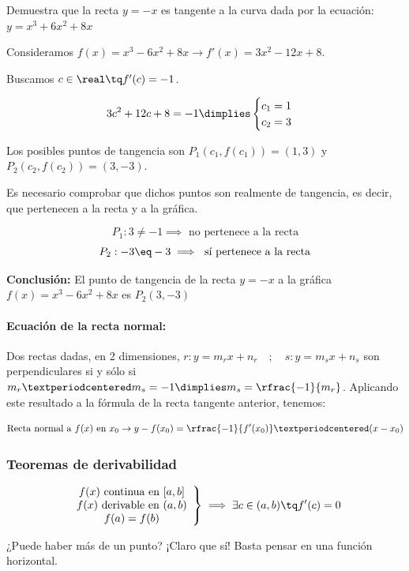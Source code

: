 \begin{problem}
Demuestra que la recta $y=-x$ es tangente a la curva dada por la ecuación: $y=x^3+6x^2+8x$
\solution

Consideramos $f(x) = x^3-6x^2+8x \to f'(x) = 3x^2-12x+8$.

Buscamos $c\in\real\tq f'(c) = -1$.

\[
	3c^2+12c+8=-1 \dimplies \begin{cases}c_1 = 1\\c_2=3\end{cases}
\]

Los posibles puntos de tangencia son $P_1(c_1,f(c_1)) = (1,3)$ y $P_2(c_2,f(c_2)) = (3,-3)$.

Es necesario comprobar que dichos puntos son realmente de tangencia, es decir, que pertenecen a la recta y a la gráfica.

\[P_1: 3\neq -1 \implies \text{ no pertenece a la recta}\]
\[P_2: -3\eq -3 \implies \text{ sí pertenece a la recta}\]

\textbf{Conclusión: } El punto de tangencia de la recta $y=-x$ a la gráfica $f(x) = x^3-6x^2+8x$ es $P_2(3,-3)$
\end{problem}

\paragraph{Ecuación de la recta normal:} Dos rectas dadas, en 2 dimensiones, $r: y=m_rx+n_r\quad;\quad s:y=m_sx+n_s$ son perpendiculares si y sólo si $m_r·m_s = -1 \dimplies m_s = \rfrac{-1}{m_r}$.
%
Aplicando este resultado a la fórmula de la recta tangente anterior, tenemos:


\begin{mdframed}
	\begin{equation}
		\label{eq::rectatangente}
		\text{Recta normal a }f(x)\text{ en }x_0 \to y-f(x_0) = \rfrac{-1}{f'(x_0)}·(x-x_0)
	\end{equation}
\end{mdframed}


\subsubsection{Teoremas de derivabilidad}

\begin{theorem}
\[
\left.
	\begin{array}{c}
		f(x)\text{ continua en } [a,b]\\
		f(x)\text{ derivable en } (a,b)\\
		f(a)=f(b)
	\end{array}
\right\}\implies \exists c\in(a,b)\tq f'(c)=0
\]
\end{theorem}
\obs ¿Puede haber más de un punto? ¡Claro que sí! Basta pensar en una función horizontal.

